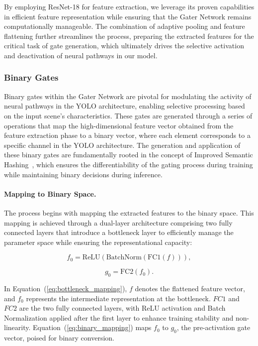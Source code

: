 By employing ResNet-18 for feature extraction, we leverage its proven capabilities in efficient feature representation while ensuring that the Gater Network remains computationally manageable. The combination of adaptive pooling and feature flattening further streamlines the process, preparing the extracted features for the critical task of gate generation, which ultimately drives the selective activation and deactivation of neural pathways in our model.

\subsubsection{Binary Gates}
Binary gates within the Gater Network are pivotal for modulating the activity of neural pathways in the YOLO architecture, enabling selective processing based on the input scene's characteristics. These gates are generated through a series of operations that map the high-dimensional feature vector obtained from the feature extraction phase to a binary vector, where each element corresponds to a specific channel in the YOLO architecture. The generation and application of these binary gates are fundamentally rooted in the concept of Improved Semantic Hashing~\cite{kaiser2018discrete,chen2019you}, which ensures the differentiability of the gating process during training while maintaining binary decisions during inference.

\paragraph{Mapping to Binary Space.} The process begins with mapping the extracted features to the binary space. This mapping is achieved through a dual-layer architecture comprising two fully connected layers that introduce a bottleneck layer to efficiently manage the parameter space while ensuring the representational capacity:

\begin{equation}
f_0 = \text{ReLU}(\text{BatchNorm}(\text{FC1}(f))),
\label{eq:bottleneck_mapping}
\end{equation}

\begin{equation}
g_0 = \text{FC2}(f_0).
\label{eq:binary_mapping}
\end{equation}

In Equation~(\ref{eq:bottleneck_mapping}), \(f\) denotes the flattened feature vector, and \(f_0\) represents the intermediate representation at the bottleneck. \(FC1\) and \(FC2\) are the two fully connected layers, with ReLU activation and Batch Normalization applied after the first layer to enhance training stability and non-linearity. Equation~(\ref{eq:binary_mapping}) maps \(f_0\) to \(g_0\), the pre-activation gate vector, poised for binary conversion.


